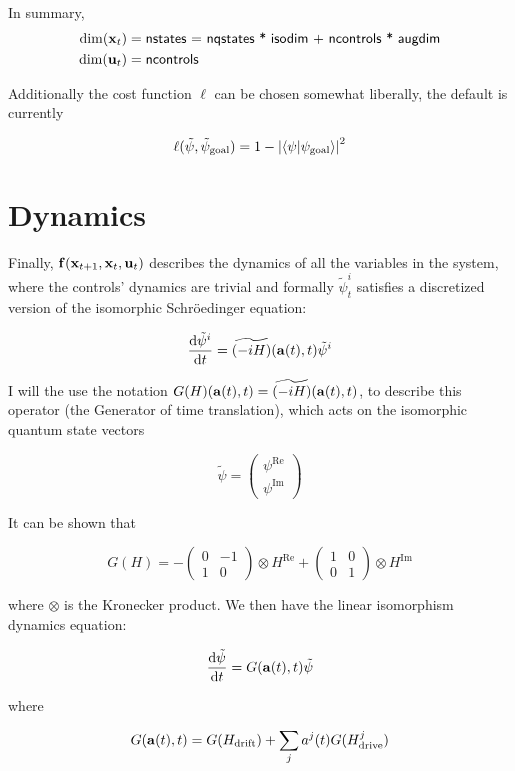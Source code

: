 \documentclass{article}
\newcommand{\isopsi}{\tilde \psi}
\begin{document}
In summary, 
\begin{align*}
  \dim(\vb{x}_t) &= \textsf{nstates = nqstates * isodim + ncontrols * augdim} \\
  \dim(\vb{u}_t) &= \textsf{ncontrols}
\end{align*}

Additionally the cost function $\ell$ can be chosen somewhat liberally, the default is currently

$$
\ell(\isopsi, \isopsi_{\text{goal}}) = 1 - \abs{\braket{\psi}{\psi_\text{goal}}}^2
$$


\newpage
\section{Dynamics}

Finally, $\vb{f}(\vb{x}_{t+1}, \vb{x}_t, \vb{u}_t)$ describes the dynamics of all the variables in the system, where the controls' dynamics are trivial and formally $\isopsi^i_t$ satisfies a discretized version of the isomorphic Schr\"oedinger equation:

$$
\dv{\isopsi^i}{t} = \widetilde{(- i H)}(\vb{a}(t), t) \isopsi^i
$$

I will the use the notation $G(H)(\vb{a}(t), t) = \widetilde{(- i H)}(\vb{a}(t), t)$, to describe this operator (the Generator of time translation), which acts on the isomorphic quantum state vectors 

$$
\isopsi = \begin{pmatrix} \psi^{\mathrm{Re}} \\ \psi^{\mathrm{Im}} \end{pmatrix}
$$ 

It can be shown that

$$
G(H) =  - \begin{pmatrix} 0 & -1 \\ 1 & 0 \end{pmatrix} \otimes H^{\mathrm{Re}} + \begin{pmatrix} 1 & 0 \\ 0 &1 \end{pmatrix} \otimes H^{\mathrm{Im}}
$$

where $\otimes$ is the Kronecker product.  We then have the linear isomorphism dynamics equation:

$$
\dv{\isopsi}{t} = G(\vb{a}(t),t) \isopsi
$$

where

$$
G(\vb{a}(t),t) = G(H_{\text{drift}}) + \sum_j a^j(t) G(H_{\text{drive}}^j) 
$$
\end{document}
